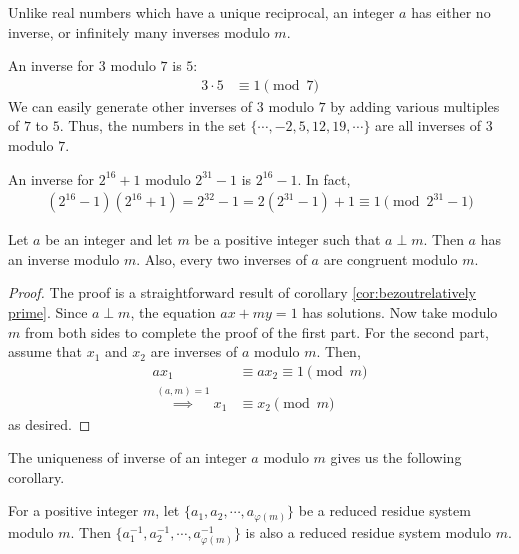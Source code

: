 \documentclass{subfile}
\begin{document}
	\begin{note}
		Unlike real numbers which have a unique reciprocal, an integer $a$ has either no inverse, or infinitely many inverses modulo $m$.
	\end{note}

	\begin{example}
		An inverse for $3$ modulo $7$ is $5$:
			\begin{align*}
				3 \cdot 5
					& \equiv 1 \pmod 7
			\end{align*}
		We can easily generate other inverses of $3$ modulo $7$ by adding various multiples of $7$ to $5$. Thus, the numbers in the set $\{\cdots, -2, 5, 12, 19, \cdots \}$ are all inverses of $3$ modulo $7$.
	\end{example}

	\begin{example}
		An inverse for $2^{16}+1$ modulo $2^{31}-1$ is $2^{16}-1$. In fact,
			\begin{align*}
				(2^{16} - 1)(2^{16} + 1) = 2^{32} -1 = 2(2^{31} - 1) + 1 \equiv 1 \pmod{2^{31} - 1}
			\end{align*}
	\end{example}


	\begin{theorem} \label{thm:arithinverse}
		Let $a$ be an integer and let $m$ be a positive integer such that $a \perp m$. Then $a$ has an inverse modulo $m$. Also, every two inverses of $a$ are congruent modulo $m$.
	\end{theorem}

	\begin{proof}
		The proof is a straightforward result of corollary \eqref{cor:bezoutrelatively prime}. Since $a \perp m$, the equation $ax+my=1$ has solutions. Now take modulo $m$ from both sides to complete the proof of the first part. For the second part, assume that $x_1$ and $x_2$ are inverses of $a$ modulo $m$. Then,
		\begin{align*}
		ax_1
			& \equiv ax_2 \equiv 1 \pmod m\\
		\stackrel{(a,m)=1}{\implies} x_1
			& \equiv x_2 \pmod m
		\end{align*}
		as desired.
	\end{proof}

The uniqueness of inverse of an integer $a$ modulo $m$ gives us the following corollary.

	\begin{corollary}
		For a positive integer $m$, let $\{a_{1}, a_{2}, \cdots, a_{\varphi(m)}\}$ be a reduced residue system modulo $m$. Then $\{a_{1}^{-1}, a_{2}^{-1}, \cdots, a_{\varphi(m)}^{-1}\}$ is also a reduced residue system modulo $m$.
	\end{corollary}
\end{document}
